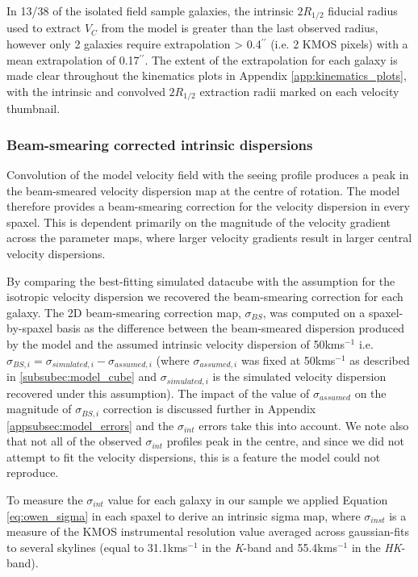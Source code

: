 \documentclass[fleqn,usenatbib]{mnras}
\begin{document}
In 13/38 of the isolated field sample galaxies, the intrinsic $2R_{1/2}$ fiducial radius used to extract $V_{C}$ from the model is greater than the last observed radius, however only 2 galaxies require extrapolation > 0.4$^{\prime\prime}$ (i.e. 2 KMOS pixels) with a mean extrapolation of 0.17$^{\prime\prime}$.
The extent of the extrapolation for each galaxy is made clear throughout the kinematics plots in Appendix \ref{app:kinematics_plots}, with the intrinsic and convolved $2R_{1/2}$ extraction radii marked on each velocity thumbnail.

\subsubsection{Beam-smearing corrected intrinsic dispersions}\label{subsubsec:beam_smearing_corrected_dispersions}
Convolution of the model velocity field with the seeing profile produces a peak in the beam-smeared velocity dispersion map at the centre of rotation.
The model therefore provides a beam-smearing correction for the velocity dispersion in every spaxel.
This is dependent primarily on the magnitude of the velocity gradient across the parameter maps, where larger velocity gradients result in larger central velocity dispersions.

By comparing the best-fitting simulated datacube with the assumption for the isotropic velocity dispersion we recovered the beam-smearing correction for each galaxy.
The 2D beam-smearing correction map, $\sigma_{BS}$, was computed on a spaxel-by-spaxel basis as the difference between the beam-smeared dispersion produced by the model and the assumed intrinsic velocity dispersion of 50kms$^{-1}$ i.e. $\sigma_{BS,i} = \sigma_{simulated,i} - \sigma_{assumed,i}$ (where $\sigma_{assumed,i}$ was fixed at 50kms$^{-1}$ as described in \cref{subsubec:model_cube} and $\sigma_{simulated,i}$ is the simulated velocity dispersion recovered under this assumption).
The impact of the value of $\sigma_{assumed}$ on the magnitude of $\sigma_{BS,i}$ correction is discussed further in Appendix \ref{appsubsec:model_errors} and the $\sigma_{int}$ errors take this into account.
We note also that not all of the observed $\sigma_{int}$ profiles peak in the centre, and since we did not attempt to fit the velocity dispersions, this is a feature the model could not reproduce. 

To measure the $\sigma_{int}$ value for each galaxy in our sample we applied Equation \ref{eq:owen_sigma} in each spaxel to derive an intrinsic sigma map, where $\sigma_{inst}$ is a measure of the KMOS instrumental resolution value averaged across gaussian-fits to several skylines (equal to 31.1kms$^{-1}$ in the {\it K}-band and 55.4kms$^{-1}$ in the {\it HK}-band).
\end{document}
